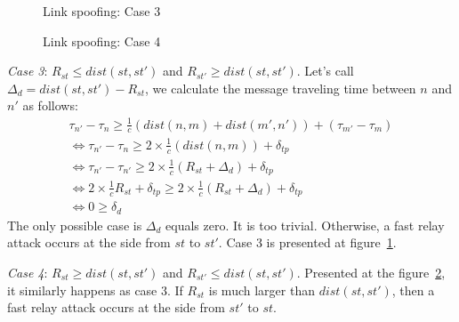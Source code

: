 \begin{figure}
	\caption{Link spoofing: Case 3} \label{chap3case3}
	\centering
\end{figure}
		
\begin{figure}
    \caption{Link spoofing: Case 4} \label{chap3case4} 
    \centering

\end{figure}

\emph{Case 3}: $R_{st} \le dist(st,st')$ and $R_{st'} \ge dist(st,st')$. Let's call $\Delta_d = dist(st,st') - R_{st}$, we calculate the message traveling time between $n$ and $n'$ as follows: 
\begin{equation*}
\begin{split}
		\tau_{n'} - \tau_{n} \ge \frac 1 {c}(dist(n,m) + dist(m', n')) + (\tau_{m'} - \tau_{m}) \\ \Leftrightarrow
		\tau_{n'} - \tau_{n} \ge 2 \times \frac 1 {c}(dist(n,m)) + \delta_{tp}\\ \Leftrightarrow
		\tau_{n'} - \tau_{n'} \ge 2 \times \frac 1 {c} (R_{st} + \Delta_d) + \delta_{tp} \\ \Leftrightarrow
		2 \times \frac 1 {c} R_{st} + \delta_{tp} \ge 2 \times \frac 1 {c} (R_{st} + \Delta_d ) + \delta_{tp} \\ \Leftrightarrow
		0 \ge \delta_{d} 
\end{split}
\end{equation*}
The only possible case is $\Delta_{d}$ equals zero. It is too trivial. Otherwise, a fast relay attack occurs at the side from $st$ to $st'$. Case 3 is presented at figure~\ref{chap3case3}.

\emph{Case 4}: $R_{st} \ge dist(st,st')$ and $R_{st'} \le dist(st,st')$. Presented at the figure~\ref{chap3case4}, it similarly happens as case 3. If $R_{st}$ is much larger than $dist(st,st')$, then a fast relay attack occurs at the side from $st'$ to $st$. 
